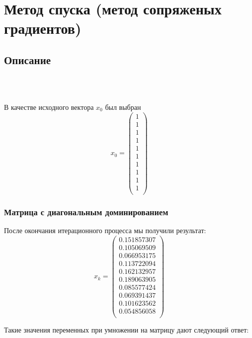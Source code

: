 \documentclass[../../report.tex]{subfiles}
\begin{document}
\chapter{Метод спуска (метод сопряженых градиентов)}

\section{Описание}
\\
\\

В качестве исходного вектора $x_0$ был выбран
\[
x_0 =
\begin{pmatrix}
  1 \\
  1 \\
  1 \\
  1 \\
  1 \\
  1 \\
  1 \\
  1 \\
  1 \\
  1 \\
\end{pmatrix}
\]

\subsection{Матрица с диагональным доминированием}
После окончания итерационного процесса мы получили результат:
\[
x_{k} = 
\begin{pmatrix}
    0.151857307 \\
    0.105069509 \\
    0.066953175 \\
    0.113722094 \\
    0.162132957 \\
    0.189063905 \\
    0.085577424 \\
    0.069391437 \\
    0.101623562 \\
    0.054856058 \\
\end{pmatrix}
\]

Такие значения переменных при умножении на матрицу дают следующий ответ:

\end{document}
